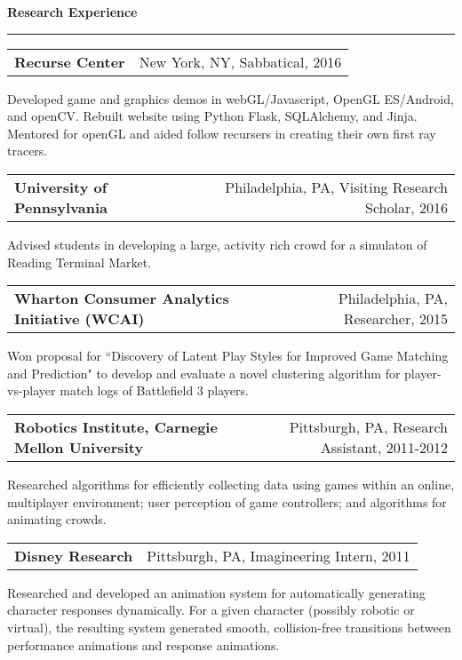 \needspace{6em}
{\Large {\bf Research Experience}} 
\vspace{0.1cm}
\hrule
\medskip

\needspace{6em}
\begin{tabular*}{7.1in}{@{}l@{\extracolsep\fill}r}
{\large {\bf Recurse Center}} & New York, NY, Sabbatical, 2016\\
\end{tabular*}
Developed game and graphics demos in webGL/Javascript, OpenGL ES/Android, and openCV. Rebuilt website using Python Flask, SQLAlchemy, and Jinja. Mentored for openGL and aided follow recursers in creating their own first ray tracers.

\medskip

\needspace{6em}
\begin{tabular*}{7.1in}{@{}l@{\extracolsep\fill}r}
{\large {\bf University of Pennsylvania}} & Philadelphia, PA, Visiting Research Scholar, 2016\\
\end{tabular*}
Advised students in developing a large, activity rich crowd for a simulaton of Reading Terminal Market.

\medskip

\needspace{6em}
\begin{tabular*}{7.1in}{@{}l@{\extracolsep\fill}r}
   {\large {\bf Wharton Consumer Analytics Initiative (WCAI)}} & Philadelphia, PA, Researcher, 2015\\
\end{tabular*}

Won proposal for ``Discovery of Latent Play Styles for Improved Game Matching and Prediction" to develop and evaluate a novel clustering algorithm for player-vs-player match logs of Battlefield 3 players.

\medskip


\needspace{6em}
\begin{tabular*}{7.1in}{@{}l@{\extracolsep\fill}r}
{\large {\bf Robotics Institute, Carnegie Mellon University}} & Pittsburgh, PA, Research Assistant, 2011-2012\\
\end{tabular*}

Researched algorithms for efficiently collecting data using games within an online, multiplayer environment; user perception of game controllers; and algorithms for animating crowds. 
\medskip

\needspace{6em}
\begin{tabular*}{7.1in}{@{}l@{\extracolsep\fill}r}
{\large {\bf Disney Research}} & Pittsburgh, PA, Imagineering Intern, 2011\\
\end{tabular*}

Researched and developed an animation system for automatically generating character responses dynamically. 
For a given character (possibly robotic or virtual), the resulting system generated 
smooth, collision-free transitions between performance animations and response animations.


